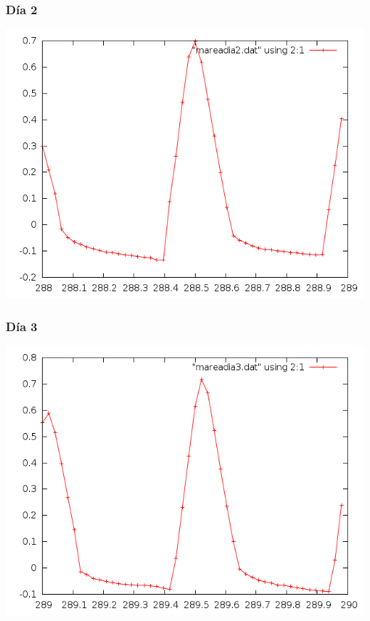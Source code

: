 \documentclass[10pt]{article}
\begin{document}
\subsubsection{Día 2}
\includegraphics[scale=0.6]{mareadia2.png}

\subsubsection{Día 3}
\includegraphics[scale=0.6]{mareadia3.png}
\end{document}
